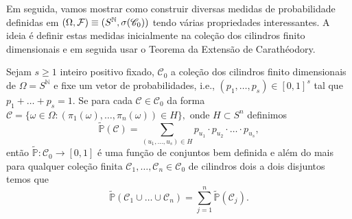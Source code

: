 Em seguida, vamos mostrar como construir diversas medidas 
de probabilidade definidas em 
$(\Omega,\mathcal{F})\equiv (S^{\mathbb{N}},\sigma(\mathscr{C}_0))$ 
tendo várias
propriedades interessantes. A ideia é definir estas medidas
inicialmente na coleção dos cilindros finito dimensionais 
e em seguida usar o Teorema da Extensão de Carathéodory.





\begin{proposicao}\label{prop-def-pre-med-prod-SN}
Sejam $s\geq 1$ inteiro positivo fixado,
$\mathscr{C}_0$ a coleção dos cilindros finito 
dimensionais de $\Omega=S^{\mathbb{N}}$
e fixe um vetor de probabilidades, i.e., 
$(p_1,\ldots,p_s)\in [0,1]^s$ tal que 
$p_1+\ldots +p_s=1$. 
Se para cada $\mathcal{C}\in\mathscr{C}_0$
da forma 
$
\mathcal{C}
=
\{
\omega\in \Omega:
(\pi_1(\omega), \ldots,\pi_n(\omega)) \in H
\},
$
onde $H\subset S^n$ definimos
\[
\widetilde{\mathbb{P}}(\mathcal{C}) 
=
\sum_{(u_1,\ldots,u_s)\in H} 
p_{u_1}\cdot p_{u_2}\cdot\ldots\cdot p_{u_s},
\]
então $\widetilde{\mathbb{P}}:\mathscr{C}_0\to [0,1]$ é uma função 
de conjuntos bem definida e além do mais para qualquer coleção
finita $\mathcal{C}_1,\ldots,\mathcal{C}_n\in\mathscr{C}_0$
de cilindros dois a dois disjuntos temos que 
\begin{equation}\label{prop-finitamente-aditiva-med-prod-SN}
\widetilde{\mathbb{P}}(\mathcal{C}_1\cup\ldots\cup \mathcal{C}_n)
=
\sum_{j=1}^n \widetilde{\mathbb{P}}(\mathcal{C}_j).
\end{equation}
\end{proposicao}



